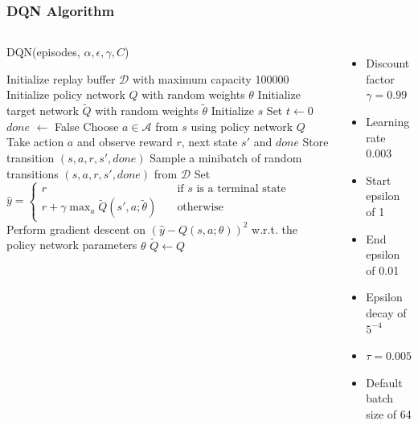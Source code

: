 \documentclass{beamer}
\begin{document}
\begin{frame}[shrink=38]
    \frametitle{DQN Algorithm}
    \begin{columns}
        \begin{algorithm}[H]
            \caption{DQN(episodes, \(\alpha, \epsilon, \gamma, C\))}
            \label{alg:dqn}
            \begin{algorithmic}[1]
                \State Initialize replay buffer \(\mathcal{D}\) with maximum capacity 100000
                \State Initialize policy network \(Q\) with random weights \(\theta\)
                \State Initialize target network \(\tilde{Q}\) with random weights \(\tilde{\theta}\)
                \State Initialize \(s\)
                \State Set \(t \leftarrow 0\)
                \State \(done\) \(\leftarrow\) False
                \State Choose \(a \in \mathcal{A}\) from \(s\) using policy network \(Q\)
                \State Take action \(a\) and observe reward \(r\), next state \(s'\) and \(done\)
                \State Store transition \((s, a, r, s', done)\)
                \State Sample a minibatch of random transitions \((s, a, r, s', done)\) from \(\mathcal{D}\)
                \State Set \(\hat{y} =
                \begin{cases}
                    r                                                  & \quad \text{if }s \text{ is a terminal state} \\
                    r + \gamma \max_a \tilde{Q}(s', a; \tilde{\theta}) & \quad \text{otherwise}
                \end{cases}\)
                \State Perform gradient descent on \(\left(\hat{y} - Q(s, a; \theta)\right)^2\) w.r.t. the policy network parameters \(\theta\)
                \State \(\tilde{Q} \leftarrow Q\)
                \EndIf
                \EndWhile
                \EndFor
            \end{algorithmic}
        \end{algorithm} \pause
        \begin{itemize}
            \item Discount factor \(\gamma = 0.99\)
            \item Learning rate 0.003
            \item Start epsilon of 1
            \item End epsilon of 0.01
            \item Epsilon decay of \(5^{-4}\)
            \item \(\tau = 0.005\)
            \item Default batch size of 64
        \end{itemize}
    \end{columns}

\end{frame}
\end{document}
